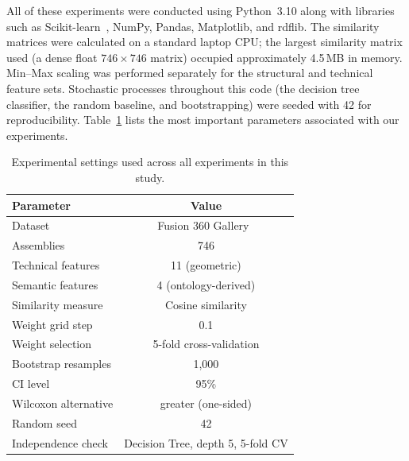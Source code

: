 \documentclass[preprint,12pt]{elsarticle}
\begin{document}
All of these experiments were conducted using Python~3.10 along with libraries such as Scikit-learn~\cite{Pedregosa2011}, NumPy, Pandas, Matplotlib, and rdflib.
The similarity matrices were calculated on a standard laptop CPU; the largest similarity matrix used (a dense float $746 \times 746$ matrix) occupied approximately 4.5\,MB in memory.
Min--Max scaling was performed separately for the structural and technical feature sets.
Stochastic processes throughout this code (the decision tree classifier, the random baseline, and bootstrapping) were seeded with 42 for reproducibility.
Table~\ref{tab:ExperimentalSettings} lists the most important parameters associated with our experiments.

\begin{table}[!ht]
\centering
\caption{Experimental settings used across all experiments in this study.}
\label{tab:ExperimentalSettings}
\begin{tabular}{lc}
\toprule
\textbf{Parameter} & \textbf{Value} \\
\midrule
Dataset & Fusion 360 Gallery~\cite{Willis2021} \\
Assemblies & 746 \\
Technical features & 11 (geometric) \\
Semantic features & 4 (ontology-derived) \\
Similarity measure & Cosine similarity \\
Weight grid step & 0.1 \\
Weight selection & 5-fold cross-validation \\
Bootstrap resamples & 1,000 \\
CI level & 95\% \\
Wilcoxon alternative & greater (one-sided) \\
Random seed & 42 \\
Independence check & Decision Tree, depth 5, 5-fold CV \\
\bottomrule
\end{tabular}
\end{table}
\end{document}
